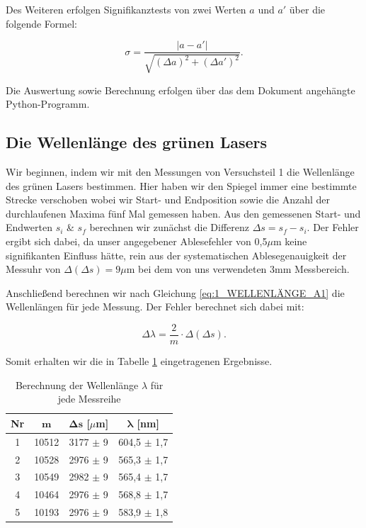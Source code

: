 \documentclass{article}
\begin{document}
Des Weiteren erfolgen Signifikanztests von zwei Werten $a$ und $a'$ über die folgende Formel:

\begin{equation}
    \sigma = \frac{|a-a'|}{\sqrt{(\Delta a)^2 + (\Delta a')^2}}.
\end{equation}

Die Auswertung sowie Berechnung erfolgen über das dem Dokument angehängte Python-Programm.

\newpage

\subsection{Die Wellenlänge des grünen Lasers}

Wir beginnen, indem wir mit den Messungen von Versuchsteil 1 die Wellenlänge des grünen Lasers bestimmen. Hier haben wir den Spiegel immer eine bestimmte Strecke verschoben wobei wir Start- und Endposition sowie die Anzahl der durchlaufenen Maxima fünf Mal gemessen haben. Aus den gemessenen Start- und Endwerten $s_i$ \& $s_f$ berechnen wir zunächst die Differenz $\Delta s = s_f - s_i$. Der Fehler ergibt sich dabei, da unser angegebener Ablesefehler von 0,5$\mu$m keine signifikanten Einfluss hätte, rein aus der systematischen Ablesegenauigkeit der Messuhr von $\Delta (\Delta s) = 9 \mu$m bei dem von uns verwendeten 3mm Messbereich. 

Anschließend berechnen wir nach Gleichung \ref{eq:1_WELLENLÄNGE_A1} die Wellenlängen für jede Messung. Der Fehler berechnet sich dabei mit:

\begin{equation}
    \Delta \lambda = \frac{2}{m} \cdot \Delta (\Delta s).
\end{equation}

Somit erhalten wir die in Tabelle \ref{tab:5LAMBDAS} eingetragenen Ergebnisse.

\phantom{.}

\begin{table}[!h]
    \centering
    \begin{tabular}{cccc}
        \hline
        \textbf{Nr} & $\bm{m}$ & $\bm{\Delta s}$ [$\mu$m] & $\bm{\lambda}$ [nm]  \\ \hline
             1 & 10512 & 3177 $\pm$ 9 & 604,5 $\pm$ 1,7 \\
             2 & 10528 & 2976 $\pm$ 9 & 565,3 $\pm$ 1,7 \\
             3 & 10549 & 2982 $\pm$ 9 & 565,4 $\pm$ 1,7 \\
             4 & 10464 & 2976 $\pm$ 9 & 568,8 $\pm$ 1,7 \\
             5 & 10193 & 2976 $\pm$ 9 & 583,9 $\pm$ 1,8 \\ \hline
    \end{tabular}%
    \caption{Berechnung der Wellenlänge $\lambda$ für jede Messreihe}
    \label{tab:5LAMBDAS}
\end{table}
\end{document}
